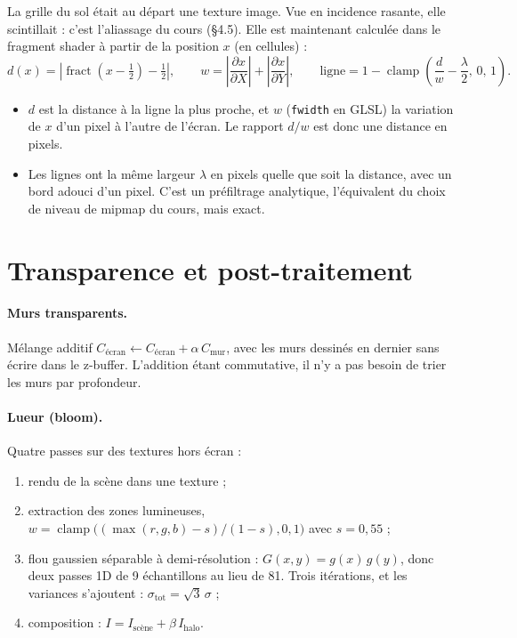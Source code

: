\documentclass[11pt,a4paper]{article}
\newcommand{\code}[1]{\texttt{#1}}
\begin{document}
La grille du sol était au départ une texture image. Vue en incidence rasante, elle scintillait : c'est l'aliassage du cours (§4.5). Elle est maintenant calculée dans le fragment shader à partir de la position $x$ (en cellules) :
\[
	d(x) = \left|\operatorname{fract}\!\left(x - \tfrac12\right) - \tfrac12\right|, \qquad
	w = \left|\frac{\partial x}{\partial X}\right| + \left|\frac{\partial x}{\partial Y}\right|, \qquad
	\text{ligne} = 1 - \operatorname{clamp}\!\left(\frac{d}{w} - \frac{\lambda}{2},\,0,\,1\right).
\]
\begin{itemize}
	\item $d$ est la distance à la ligne la plus proche, et $w$ (\code{fwidth} en GLSL) la variation de $x$ d'un pixel à l'autre de l'écran. Le rapport $d/w$ est donc une distance en pixels.
	\item Les lignes ont la même largeur $\lambda$ en pixels quelle que soit la distance, avec un bord adouci d'un pixel. C'est un préfiltrage analytique, l'équivalent du choix de niveau de mipmap du cours, mais exact.
\end{itemize}

\section{Transparence et post-traitement}

\paragraph{Murs transparents.} Mélange additif $C_{\text{écran}} \leftarrow C_{\text{écran}} + \alpha\, C_{\text{mur}}$, avec les murs dessinés en dernier sans écrire dans le z-buffer. L'addition étant commutative, il n'y a pas besoin de trier les murs par profondeur.

\paragraph{Lueur (bloom).} Quatre passes sur des textures hors écran :
\begin{enumerate}
	\item rendu de la scène dans une texture ;
	\item extraction des zones lumineuses, $w = \operatorname{clamp}\big((\max(r,g,b) - s)/(1 - s), 0, 1\big)$ avec $s = 0{,}55$ ;
	\item flou gaussien séparable à demi-résolution : $G(x,y) = g(x)\,g(y)$, donc deux passes 1D de 9 échantillons au lieu de 81. Trois itérations, et les variances s'ajoutent : $\sigma_{\text{tot}} = \sqrt{3}\,\sigma$ ;
	\item composition : $I = I_{\text{scène}} + \beta\, I_{\text{halo}}$.
\end{enumerate}
\end{document}
